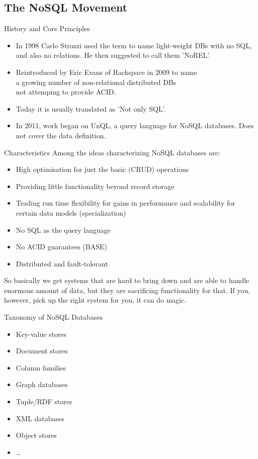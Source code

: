 \documentclass{beamer}
\begin{document}
\subsection{The NoSQL Movement}
\begin{frame}{History and Core Principles}
  \begin{itemize}
    \item In 1998 Carlo Strozzi used the term to name light-weight DBs with no SQL,
          and also no relations. He then suggested to call them 'NoREL'.
    \item Reintroduced by Eric Evans of Rackspace in 2009 to name\\a growing
          number of non-relational distributed DBs\\not attemping to provide ACID.
    \item Today it is usually translated as 'Not only SQL'.
    \item In 2011, work began on UnQL, a query language for NoSQL databases.
          Does not cover the data definition.
  \end{itemize}
\end{frame}

\begin{frame}{Characteristics}
  Among the ideas characterizing NoSQL databases are:
  \begin{itemize}
    \item High optimisation for just the basic (CRUD) operations
    \item Providing little functionality beyond record storage
    \item Trading run time flexibility for gains in performance and scalability
          for certain data models (specialization)
    \item No SQL as the query language
    \item No ACID guarantees (BASE)
    \item Distributed and fault-tolerant
  \end{itemize}
  So basically we get systems that are hard to bring down and are able to handle
  enormous amount of data, but they are sacrificing functionality for that.
  If you, however, pick up the right system for you, it can do magic.
\end{frame}

\begin{frame}{Taxonomy of NoSQL Databases}
  \begin{itemize}
    \item Key-value stores
    \item \alert<2>{Document stores}
    \item Column families
    \item Graph databases
    \item Tuple/RDF stores
    \item XML databases
    \item Object stores
    \item \ldots
  \end{itemize}
\end{frame}
\end{document}

